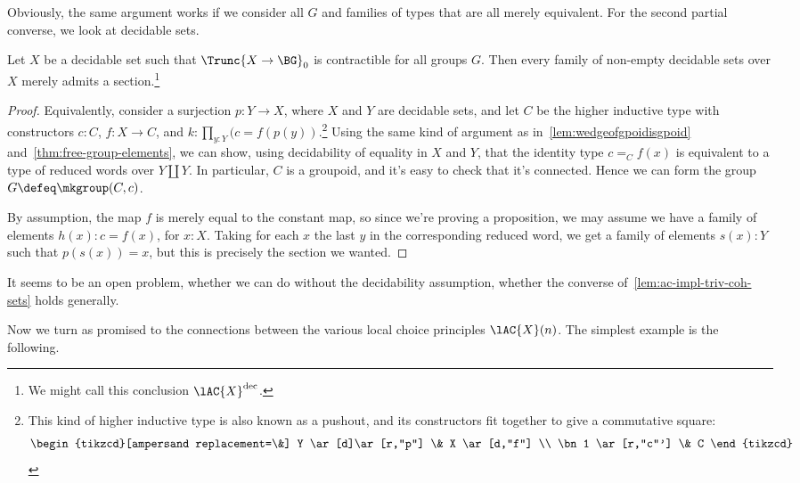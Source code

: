 Obviously, the same argument works if we consider all \inftygps $G$
and families of types that are all merely equivalent.
For the second partial converse, we look at decidable sets.

\begin{theorem}[Blass]\label{thm:Blass-2}
  Let $X$ be a decidable set such that $\Trunc{X \to \BG}_0$ is contractible
  for all groups $G$.
  Then every family of non-empty decidable sets over $X$
  merely admits a section.\footnote{%
    We might call this conclusion $\lAC{X}^{\mathrm{dec}}$.}
\end{theorem}

\begin{proof}
  Equivalently, consider a surjection $p : Y \to X$,
  where $X$ and $Y$ are decidable sets,
  and let $C$ be the higher inductive type with constructors
  $c : C$, $f : X \to C$, and $k : \prod_{y:Y}(c = f(p(y))$.\footnote{%
    This kind of higher inductive type is also known as a pushout,
    and its constructors fit together to give a commutative square:
    \[
      \begin{tikzcd}[ampersand replacement=\&]
        Y \ar[d]\ar[r,"p"] \& X \ar[d,"f"] \\
        \bn 1 \ar[r,"c"'] \& C
      \end{tikzcd}
    \]}
  Using the same kind of argument as in~\cref{lem:wedgeofgpoidisgpoid}
  and~\cref{thm:free-group-elements}, we can show,
  using decidability of equality in $X$ and $Y$,
  that the identity type $c =_C f(x)$ is equivalent to a type of reduced words
  over $Y \coprod Y$.
  In particular, $C$ is a groupoid, and it's easy to check that it's connected.
  Hence we can form the group $G \defeq \mkgroup(C,c)$.

  By assumption, the map $f$ is merely equal to the constant map,
  so since we're proving a proposition,
  we may assume we have a family of elements $h(x) : c = f(x)$, for $x:X$.
  Taking for each $x$ the last $y$ in the corresponding reduced word,
  we get a family of elements $s(x) : Y$
  such that $p(s(x)) = x$,
  but this is precisely the section we wanted.
\end{proof}

It seems to be an open problem, whether we can do without the decidability assumption,
\ie whether the converse of~\cref{lem:ac-impl-triv-coh-sets} holds generally.

Now we turn as promised to the connections between the various local choice principles
$\lAC{X}(n)$.
The simplest example is the following.

